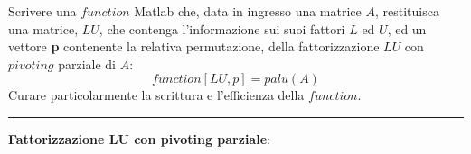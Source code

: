 Scrivere una $function$ Matlab che, data in ingresso una matrice $A$, restituisca una matrice, $LU$, che contenga l’informazione sui suoi fattori $L$ ed $U$, ed un vettore \textbf{p} contenente la relativa permutazione, della fattorizzazione $LU$ con $pivoting$ parziale di $A$:
$$function [LU,p] = palu(A)$$
Curare particolarmente la scrittura e l’efficienza della $function$.

\hspace*{\fill}
\par\noindent\rule{\textwidth}{0.4pt}
\hspace*{\fill}

\textbf{Fattorizzazione LU con pivoting parziale}:

